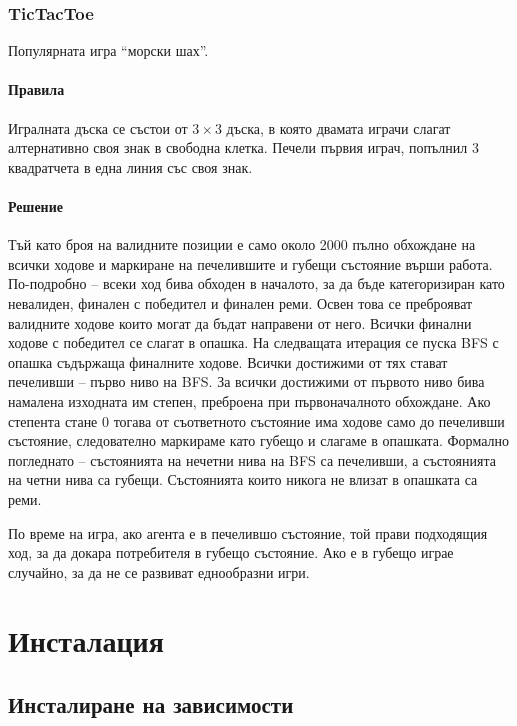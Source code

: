 \documentclass[a4paper]{article}
\begin{document}
    \subsubsection{TicTacToe}
    Популярната игра ``морски шах''.

    \paragraph{Правила}
    Игралната дъска се състои от $3 \times 3$ дъска, в която двамата играчи
    слагат алтернативно своя знак в свободна клетка. Печели първия играч,
    попълнил 3 квадратчета в една линия със своя знак.

    \paragraph{Решение}
    Тъй като броя на валидните позиции е само около 2000 пълно обхождане на
    всички ходове и маркиране на печелившите и губещи състояние върши работа.
    По-подробно -- всеки ход бива обходен в началото, за да бъде категоризиран
    като невалиден, финален с победител и финален реми. Освен това се
    преброяват валидните ходове които могат да бъдат направени от него. Всички
    финални ходове с победител се слагат в опашка. На следващата итерация се
    пуска BFS с опашка съдържаща финалните ходове. Всички достижими от тях
    стават печеливши -- първо ниво на BFS. За всички достижими от първото ниво
    бива намалена изходната им степен, преброена при първоначалното обхождане.
    Ако степента стане 0 тогава от съответното състояние има ходове само до
    печеливши състояние, следователно маркираме като губещо и слагаме
    в опашката. Формално погледнато -- състоянията на нечетни нива на BFS са
    печеливши, а състоянията на четни нива са губещи. Състоянията които никога
    не влизат в опашката са реми.

    По време на игра, ако агента е в печелившо състояние, той прави подходящия
    ход, за да докара потребителя в губещо състояние. Ако е в губещо играе
    случайно, за да не се развиват еднообразни игри.

\section{Инсталация}

\subsection{Инсталиране на зависимости}
\end{document}
